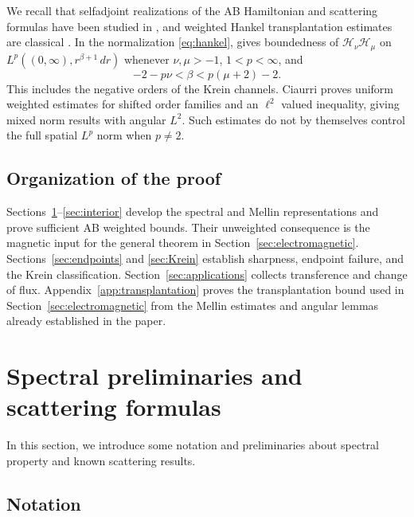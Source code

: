 \documentclass[11pt,a4paper,reqno,backref=page]{amsart}
\newcommand{\HH}{\mathcal H}                 %
\numberwithin{equation}{section}
\theoremstyle{definition}
\theoremstyle{remark}
\begin{document}
We recall that selfadjoint realizations of the AB Hamiltonian
and scattering formulas have been studied in
\cite{Ruijsenaars1983,AdamiTeta1998,Richard2009,
  PankrashkinRichard2011,Fermi2024},
and weighted Hankel transplantation estimates are classical
\cite{Stempak2002,NowakStempak2006}. In the normalization
\eqref{eq:hankel}, \cite[Corollary~1.4]{Stempak2002} gives
boundedness of $\HH_\nu\HH_\mu$ on
$L^p((0,\infty),r^{\beta+1}\,dr)$ whenever
$\nu,\mu>-1$, $1<p<\infty$, and
\begin{equation*}
  -2-p\nu<\beta<p(\mu+2)-2.
\end{equation*}
This includes the negative orders of the Krein channels.
Ciaurri \cite{Ciaurri2026} proves uniform weighted estimates
for shifted order families and an $\ell^2$ valued inequality,
giving mixed norm results with angular $L^2$.
Such estimates do not by themselves control the full spatial
$L^p$ norm when $p\ne2$.


\subsection{Organization of the proof}

Sections~\ref{sec:prelim}--\ref{sec:interior} develop the
spectral and Mellin representations and prove sufficient AB
weighted bounds. Their unweighted consequence is the
magnetic input for the general theorem in
Section~\ref{sec:electromagnetic}.
Sections~\ref{sec:endpoints} and \ref{sec:Krein} establish
sharpness, endpoint failure, and the Krein classification.
Section~\ref{sec:applications} collects transference and
change of flux. Appendix~\ref{app:transplantation} proves
the transplantation bound used in
Section~\ref{sec:electromagnetic} from the Mellin estimates
and angular lemmas already established in the paper.


\section{Spectral preliminaries and scattering formulas}
\label{sec:prelim}

In this section, we introduce some notation and preliminaries about spectral property and known scattering results. 

\subsection{Notation}
\end{document}
